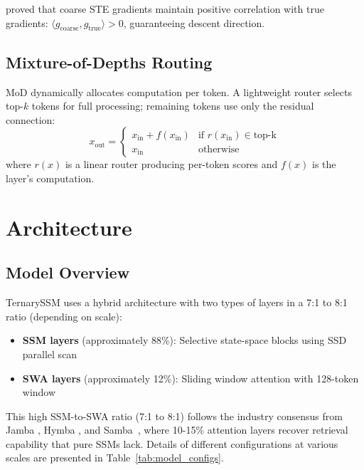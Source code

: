 \documentclass{article}
\begin{document}
\citet{yin2019understanding} proved that coarse STE gradients maintain positive correlation with true gradients: $\langle g_\text{coarse}, g_\text{true} \rangle > 0$, guaranteeing descent direction.

\subsection{Mixture-of-Depths Routing}

MoD dynamically allocates computation per token. A lightweight router selects top-$k$ tokens for full processing; remaining tokens use only the residual connection:
\begin{equation}
x_\text{out} = \begin{cases} x_\text{in} + f(x_\text{in}) & \text{if } r(x_\text{in}) \in \text{top-k} \\ x_\text{in} & \text{otherwise} \end{cases}
\end{equation}
where $r(x)$ is a linear router producing per-token scores and $f(x)$ is the layer's computation.

\section{Architecture}

\subsection{Model Overview}

TernarySSM uses a hybrid architecture with two types of layers in a 7:1 to 8:1 ratio (depending on scale):
\begin{itemize}
    \item \textbf{SSM layers} (approximately 88\%): Selective state-space blocks using SSD parallel scan
    \item \textbf{SWA layers} (approximately 12\%): Sliding window attention with 128-token window
\end{itemize}

This high SSM-to-SWA ratio (7:1 to 8:1) follows the industry consensus from Jamba \citep{jamba2024}, Hymba \citep{hymba2024}, and Samba~\citep{pmlr2024samba}, where 10-15\% attention layers recover retrieval capability that pure SSMs lack. Details of different configurations at various scales are presented in Table~\ref{tab:model_configs}.
\end{document}
